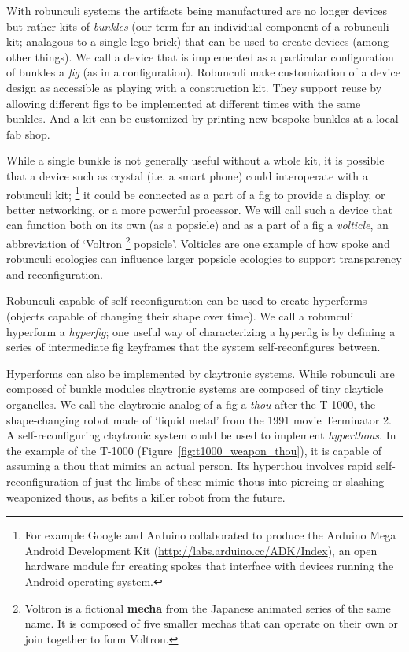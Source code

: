 With robunculi systems the artifacts being manufactured are no longer devices but rather kits of \emph{bunkles} (our term for an individual component of a robunculi kit; analagous to a single lego brick) that can be used to create devices (among other things). We call a device that is implemented as a particular configuration of bunkles a \emph{fig} (as in a configuration). Robunculi make customization of a device design as accessible as playing with a construction kit. They support reuse by allowing different figs to be implemented at different times with the same bunkles. And a kit can be customized by printing new bespoke bunkles at a local fab shop.

While a single bunkle is not generally useful without a whole kit, it is possible that a device such as crystal (i.e. a smart phone) could interoperate with a robunculi kit;%
\footnote{For example Google and Arduino collaborated to produce the Arduino Mega Android Development Kit (\url{http://labs.arduino.cc/ADK/Index}), an open hardware module for creating spokes that interface with devices running the Android operating system.}
it could be connected as a part of a fig to provide a display, or better networking, or a more powerful processor.
We will call such a device that can function both on its own (as a popsicle) and as a part of a fig a \emph{volticle}, an abbreviation of `Voltron%
\footnote{Voltron is a fictional \textbf{mecha} from the Japanese animated series of the same name. It is composed of five smaller mechas that can operate on their own or join together to form Voltron.}
popsicle'.
Volticles are one example of how spoke and robunculi ecologies can influence larger popsicle ecologies to support transparency and reconfiguration.

Robunculi capable of self-reconfiguration can be used to create hyperforms (objects capable of changing their shape over time). We call a robunculi hyperform a \emph{hyperfig}; one useful way of characterizing a hyperfig is by defining a series of intermediate fig keyframes that the system self-reconfigures between. 

Hyperforms can also be implemented by claytronic systems. While robunculi are composed of bunkle modules claytronic systems are composed of tiny clayticle organelles. We call the claytronic analog of a fig a \emph{thou} after the T-1000, the shape-changing robot made of `liquid metal' from the 1991 movie Terminator 2. A self-reconfiguring claytronic system could be used to implement \emph{hyperthous}. In the example of the T-1000 (Figure~\ref{fig:t1000_weapon_thou}), it is capable of assuming a thou that mimics an actual person. Its hyperthou involves rapid self-reconfiguration of just the limbs of these mimic thous into piercing or slashing weaponized thous, as befits a killer robot from the future. 

